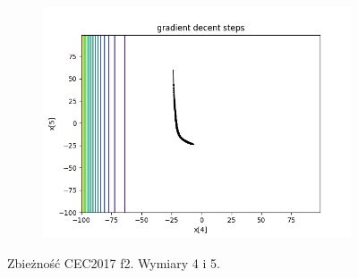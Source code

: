 \begin{figure}[h!]
\begin{subfigure}[b]{0.45\linewidth}
			\includegraphics[width=\linewidth]{photos/f2_3_2.png}
		\end{subfigure}
		\caption{Zbieżność CEC2017 f2. Wymiary 4 i 5.}
	\end{figure}
	\newpage
	
